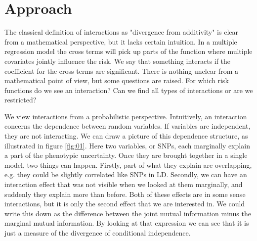 \documentclass{bioinfo}
\begin{document}
\section{Approach}
The classical definition of interactions as "divergence from additivity" is clear from a mathematical perspective, but it lacks certain intuition. In a multiple regression model the cross terms will pick up parts of the function where multiple covariates jointly influence the risk. We say that something interacts if the coefficient for the cross terms are significant. There is nothing unclear from a mathematical point of view, but some questions are raised. For which risk functions do we see an interaction? Can we find all types of interactions or are we restricted?

We view interactions from a probabilistic perspective. Intuitively, an interaction concerns the dependence between random variables. If variables are independent, they are not interacting. We can draw a picture of this dependence structure, as illustrated in figure \ref{fig:01}. Here two variables, or SNPs, each marginally explain a part of the phenotypic uncertainty. Once they are brought together in a single model, two things can happen. Firstly, part of what they explain are overlapping, e.g. they could be slightly correlated like SNPs in LD. Secondly, we can have an interaction effect that was not visible when we looked at them marginally, and suddenly they explain more than before. Both of these effects are in some sense interactions, but it is only the second effect that we are interested in. We could write this down as the difference between the joint mutual information minus the marginal mutual information. By looking at that expression we can see that it is just a measure of the divergence of conditional independence.
\end{document}
